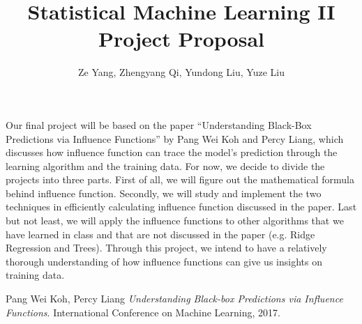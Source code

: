 \documentclass[10 pt]{hwtemplate} %
\title{\textbf{Statistical Machine Learning II Project Proposal}}
\author{Ze Yang, Zhengyang Qi, Yundong Liu, Yuze Liu}
\begin{document}
\maketitle


Our final project will be based on the paper ``Understanding Black-Box Predictions via Influence Functions'' by Pang Wei Koh and Percy Liang\cite{icml17}, which discusses how influence function can trace the model’s prediction through the learning algorithm and the training data. For now, we decide to divide the projects into three parts. First of all, we will figure out the mathematical formula behind influence function. Secondly, we will study and implement the two techniques in efficiently calculating influence function discussed in the paper. Last but not least, we will apply the influence functions to other algorithms that we have learned in class and that are not discussed in the paper (e.g. Ridge Regression and Trees). Through this project, we intend to have a relatively thorough understanding of how influence functions can give us insights on training data.


\begin{thebibliography}{}
Pang Wei Koh, Percy Liang
\textit{Understanding Black-box Predictions via Influence Functions}. International Conference on Machine Learning, 2017.
\end{thebibliography}
\end{document}
